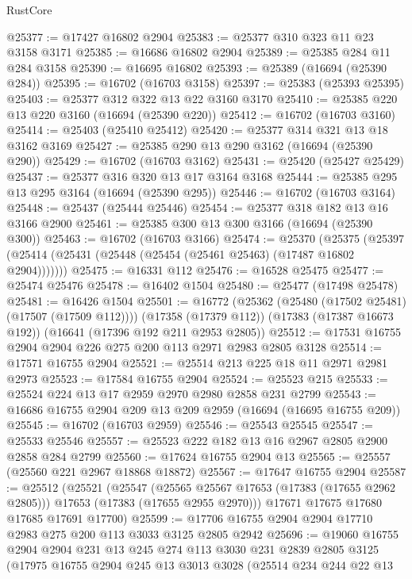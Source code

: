\begin{lexlean}{RustCore}
\begin{coremodule}
@25377 := @17427 @16802 @2904
@25383 := @25377 @310 @323 @11 @23 @3158 @3171
@25385 := @16686 @16802 @2904
@25389 := @25385 @284 @11 @284 @3158
@25390 := @16695 @16802
@25393 := @25389 (@16694 (@25390 @284))
@25395 := @16702 (@16703 @3158)
@25397 := @25383 (@25393 @25395)
@25403 := @25377 @312 @322 @13 @22 @3160 @3170
@25410 := @25385 @220 @13 @220 @3160 (@16694 (@25390 @220))
@25412 := @16702 (@16703 @3160)
@25414 := @25403 (@25410 @25412)
@25420 := @25377 @314 @321 @13 @18 @3162 @3169
@25427 := @25385 @290 @13 @290 @3162 (@16694 (@25390 @290))
@25429 := @16702 (@16703 @3162)
@25431 := @25420 (@25427 @25429)
@25437 := @25377 @316 @320 @13 @17 @3164 @3168
@25444 := @25385 @295 @13 @295 @3164 (@16694 (@25390 @295))
@25446 := @16702 (@16703 @3164)
@25448 := @25437 (@25444 @25446)
@25454 := @25377 @318 @182 @13 @16 @3166 @2900
@25461 := @25385 @300 @13 @300 @3166 (@16694 (@25390 @300))
@25463 := @16702 (@16703 @3166)
@25474 := @25370
    (@25375 (@25397 (@25414 (@25431 (@25448 (@25454 (@25461 @25463) (@17487 @16802 @2904)))))))
@25475 := @16331 @112
@25476 := @16528 @25475
@25477 := @25474 @25476
@25478 := @16402 @1504
@25480 := @25477 (@17498 @25478)
@25481 := @16426 @1504
@25501 := @16772
    (@25362 (@25480 (@17502 @25481) (@17507 (@17509 @112))))
    (@17358 (@17379 @112))
    (@17383 (@17387 @16673 @192))
    (@16641 (@17396 @192 @211 @2953 @2805))
@25512 := @17531 @16755 @2904 @2904 @226 @275 @200 @113 @2971 @2983 @2805 @3128
@25514 := @17571 @16755 @2904
@25521 := @25514 @213 @225 @18 @11 @2971 @2981 @2973
@25523 := @17584 @16755 @2904
@25524 := @25523 @215
@25533 := @25524 @224 @13 @17 @2959 @2970 @2980 @2858 @231 @2799
@25543 := @16686 @16755 @2904 @209 @13 @209 @2959 (@16694 (@16695 @16755 @209))
@25545 := @16702 (@16703 @2959)
@25546 := @25543 @25545
@25547 := @25533 @25546
@25557 := @25523 @222 @182 @13 @16 @2967 @2805 @2900 @2858 @284 @2799
@25560 := @17624 @16755 @2904 @13
@25565 := @25557 (@25560 @221 @2967 @18868 @18872)
@25567 := @17647 @16755 @2904
@25587 := @25512
    (@25521
      (@25547
        (@25565 @25567 @17653 (@17383 (@17655 @2962 @2805)))
        @17653
        (@17383 (@17655 @2955 @2970)))
      @17671
      @17675
      @17680
      @17685
      @17691
      @17700)
@25599 := @17706 @16755 @2904 @2904 @17710 @2983 @275 @200 @113 @3033 @3125 @2805 @2942
@25696 := @19060
    @16755
    @2904
    @2904
    @231
    @13
    @245
    @274
    @113
    @3030
    @231
    @2839
    @2805
    @3125
    (@17975
      @16755
      @2904
      @245
      @13
      @3013
      @3028
      (@25514
        @234
        @244
        @22
        @13

\end{coremodule}
\end{lexlean}
